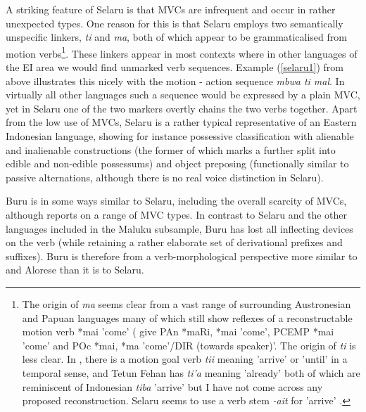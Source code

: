 A striking feature of Selaru is that MVCs are infrequent and occur in rather unexpected types. One reason for this is that Selaru employs two semantically unspecific linkers, \textit{ti} and \textit{ma}, both of which appear to be grammaticalised from motion verbs\footnote{The origin of \textit{ma} seems clear from a vast range of surrounding Austronesian and Papuan languages many of which still show reflexes of a reconstructable motion verb *mai 'come' (\citealt{ross2008lexicon} give PAn *maRi, *mai 'come', PCEMP *mai 'come' and POc *mai, *ma 'come'/DIR (towards speaker)'. The origin of \textit{ti} is less clear. In , there is a motion goal verb \textit{tii} meaning 'arrive' or 'until' in a temporal sense, and Tetun Fehan has \textit{ti'a} meaning 'already' both of which are reminiscent of Indonesian \textit{tiba} 'arrive' but I have not come across any proposed reconstruction. Selaru seems to use a verb stem \textit{-ait} for 'arrive' \citep[175]{coward2005}.}. These linkers appear in most contexts where in other languages of the EI area we would find unmarked verb sequences. Example (\ref{selaru1}) from above illustrates this nicely with the motion - action sequence \textit{mbwa ti mal}. In virtually all other languages such a sequence would be expressed by a plain MVC, yet in Selaru one of the two markers overtly chains the two verbs together. Apart from the low use of MVCs, Selaru is a rather typical representative of an Eastern Indonesian language, showing for instance possessive classification with alienable and inalienable constructions (the former of which marks a further split into edible and non-edible possessums) and object preposing (functionally similar to passive alternations, although there is no real voice distinction in Selaru). 

Buru is in some ways similar to Selaru, including the overall scarcity of MVCs, although \citet{grimes1991buru} reports on a range of MVC types. In contrast to Selaru and the other languages included in the Maluku subsample, Buru has lost all inflecting devices on the verb (while retaining a rather elaborate set of derivational prefixes and suffixes). Buru is therefore from a verb-morphological perspective more similar to  and Alorese than it is to Selaru.

